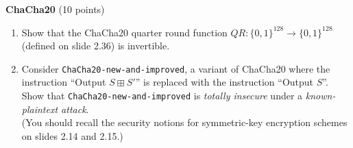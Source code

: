 \begin{problem}{\bf ChaCha20} (10 points)
\begin{enumerate}[label=(\alph*)]
\item Show that the ChaCha20 quarter round function $QR : \{0,1\}^{128}
\longrightarrow \{0,1\}^{128}$ (defined on slide 2.36) is invertible.
\item Consider \texttt{ChaCha20-new-and-improved}, a variant of ChaCha20
where the instruction ``Output $S \boxplus S'$'' is replaced with the
instruction ``Output $S$''. Show that \texttt{ChaCha20-new-and-improved}
is \emph{totally insecure} under a \emph{known-plaintext attack}.\\
(You should recall the security notions for symmetric-key encryption
schemes on slides 2.14 and 2.15.)
\end{enumerate}
\end{problem}

